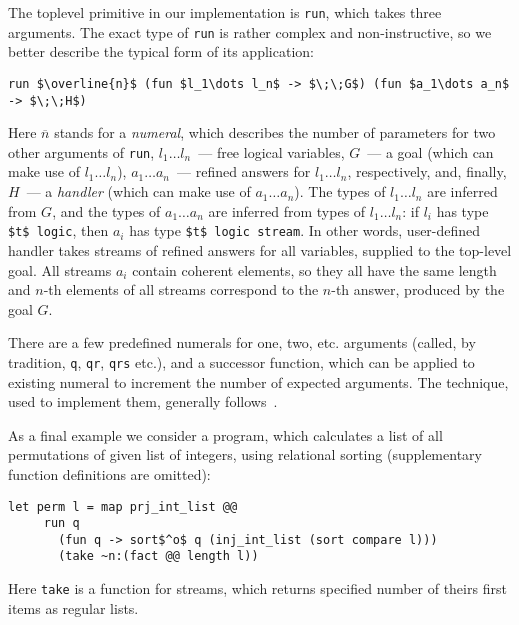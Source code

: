 \documentclass[10pt, oneside, nocopyrightspace]{sigplanconf}
\begin{document}
The toplevel primitive in our implementation is \lstinline{run}, which takes three
arguments. The exact type of \lstinline{run} is rather complex and non-instructive, 
so we better describe the typical form of its application:

\begin{lstlisting}[mathescape=true]
   run $\overline{n}$ (fun $l_1\dots l_n$ -> $\;\;G$) (fun $a_1\dots a_n$ -> $\;\;H$)
\end{lstlisting}

Here $\overline{n}$ stands for a \emph{numeral}, which describes the number of
parameters for two other arguments of \lstinline{run}, \mbox{$l_1\dots l_n$}~---
free logical variables, $G$~--- a goal (which can make use of \mbox{$l_1\dots l_n$}), 
\mbox{$a_1\dots a_n$}~--- refined answers for \mbox{$l_1\dots l_n$}, respectively, and, 
finally, $H$~--- a \emph{handler} (which can make use of \mbox{$a_1\dots a_n$}). The types of 
\mbox{$l_1\dots l_n$} are inferred from $G$, and the types of \mbox{$a_1\dots a_n$} are
inferred from types of \mbox{$l_1\dots l_n$}: if $l_i$ has type \lstinline[mathescape=true]{$t$ logic}, then
$a_i$ has type \lstinline[mathescape=true]{$t$ logic stream}. In other words, user-defined handler
takes streams of refined answers for all variables, supplied to the top-level goal. All streams $a_i$ contain
coherent elements, so they all have the same length and $n$-th elements of all streams correspond 
to the $n$-th answer, produced by the goal $G$.

There are a few predefined numerals for one, two, etc. arguments (called, by tradition, 
\lstinline{q}, \lstinline{qr}, \lstinline{qrs} etc.), and a successor function, which 
can be applied to existing numeral to increment the number of expected arguments. The
technique, used to implement them, generally follows~\cite{Unparsing, DoWeNeed}.

As a final example we consider a program, which calculates a list of all permutations of
given list of integers, using relational sorting (supplementary function definitions are
omitted):

\begin{lstlisting}[mathescape=true]
   let perm l = map prj_int_list @@ 
     run q 
       (fun q -> sort$^o$ q (inj_int_list (sort compare l))) 
       (take ~n:(fact @@ length l))
\end{lstlisting}

Here \lstinline{take} is a function for streams, which returns specified number of
theirs first items as regular lists.
\end{document}

